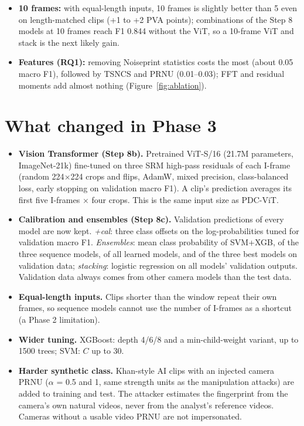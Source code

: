 \documentclass[11pt,a4paper]{article}
\begin{document}
\begin{itemize}
\item \textbf{10 frames:} with equal-length inputs, 10 frames is slightly better than 5 even on length-matched clips (+1 to +2 PVA points); combinations of the Step 8 models at 10 frames reach F1 0.844 without the ViT, so a 10-frame ViT and stack is the next likely gain.
\item \textbf{Features (RQ1):} removing Noiseprint statistics costs the most (about 0.05 macro F1), followed by TSNCS and PRNU (0.01--0.03); FFT and residual moments add almost nothing (Figure~\ref{fig:ablation}).
\end{itemize}
\section{What changed in Phase 3}\begin{itemize}
\item \textbf{Vision Transformer (Step 8b).} Pretrained ViT-S/16 (21.7M parameters, ImageNet-21k) fine-tuned on three SRM high-pass residuals of each I-frame (random 224$\times$224 crops and flips, AdamW, mixed precision, class-balanced loss, early stopping on validation macro F1). A clip's prediction averages its first five I-frames $\times$ four crops. This is the same input size as PDC-ViT.
\item \textbf{Calibration and ensembles (Step 8c).} Validation predictions of every model are now kept. \emph{+cal}: three class offsets on the log-probabilities tuned for validation macro F1. \emph{Ensembles}: mean class probability of SVM+XGB, of the three sequence models, of all learned models, and of the three best models on validation data; \emph{stacking}: logistic regression on all models' validation outputs. Validation data always comes from other camera models than the test data.
\item \textbf{Equal-length inputs.} Clips shorter than the window repeat their own frames, so sequence models cannot use the number of I-frames as a shortcut (a Phase 2 limitation).
\item \textbf{Wider tuning.} XGBoost: depth 4/6/8 and a min-child-weight variant, up to 1500 trees; SVM: $C$ up to 30.
\item \textbf{Harder synthetic class.} Khan-style AI clips with an injected camera PRNU ($\alpha$ = 0.5 and 1, same strength units as the manipulation attacks) are added to training and test. The attacker estimates the fingerprint from the camera's own natural videos, never from the analyst's reference videos. Cameras without a usable video PRNU are not impersonated.
\end{itemize}
\end{document}
